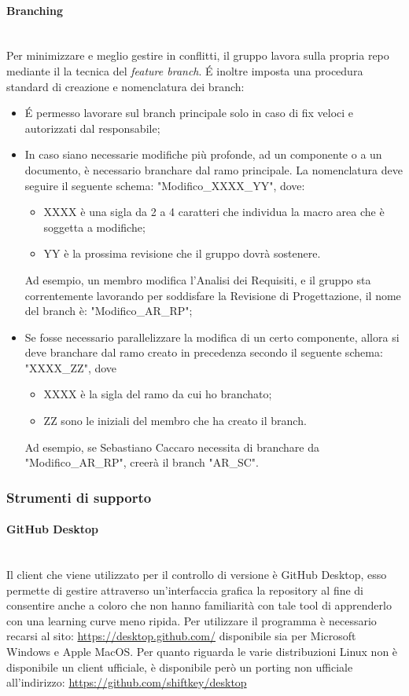 {\paragraph{Branching}\mbox{}\\
Per minimizzare e meglio gestire in conflitti, il gruppo \gruppo \space lavora sulla propria repo mediante il la tecnica del \textit{feature branch}.
\'E inoltre imposta una procedura standard di creazione e nomenclatura dei branch:
\begin{itemize}
	\item \'E permesso lavorare sul branch principale solo in caso di fix veloci e autorizzati dal responsabile;
	\item In caso siano necessarie modifiche più profonde, ad un componente o a un documento, è necessario branchare dal ramo principale. La nomenclatura deve seguire il seguente schema: "Modifico\_XXXX\_YY", dove:
	\begin{itemize}
		\item XXXX è una sigla da 2 a 4 caratteri che individua la macro area che è soggetta a modifiche;
		\item YY è la prossima revisione che il gruppo dovrà sostenere.
	\end{itemize}
	Ad esempio, un membro modifica l'Analisi dei Requisiti, e il gruppo sta correntemente lavorando per soddisfare la Revisione di Progettazione, il nome del branch è: "Modifico\_AR\_RP";
	\item Se fosse necessario parallelizzare la modifica di un certo componente, allora si deve branchare dal ramo creato in precedenza secondo il seguente schema: "XXXX\_ZZ", dove
	\begin{itemize}
		\item XXXX è la sigla del ramo da cui ho branchato;
		\item ZZ sono le iniziali del membro che ha creato il branch.
	\end{itemize}
	Ad esempio, se Sebastiano Caccaro necessita di branchare da "Modifico\_AR\_RP", creerà il branch "AR\_SC".

\end{itemize}

\subsubsection{Strumenti di supporto}
\paragraph{GitHub Desktop}\mbox{}\\
Il {client} che viene utilizzato per il controllo di versione è GitHub Desktop, esso permette di gestire attraverso un'interfaccia grafica 
la {repository} al fine di consentire anche a coloro che non hanno familiarità con tale tool di apprenderlo con una {learning curve} meno ripida. 
Per utilizzare il programma è necessario recarsi al sito: \url{https://desktop.github.com/} disponibile sia per {Microsoft Windows} e {Apple MacOS}. 
Per quanto riguarda le varie {distribuzioni Linux} non è disponibile un client ufficiale, è disponibile però un {porting} 
non ufficiale all'indirizzo: \url{https://github.com/shiftkey/desktop}

}
